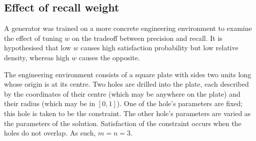 \documentclass[../../main.tex]{subfiles}
\begin{document}
\subsection{Effect of recall weight}

A generator was trained on a more concrete engineering environment to examine the effect of tuning $w$ on the tradeoff between precision and recall.
It is hypothesised that low $w$ causes high satisfaction probability but low relative density, whereas high $w$ causes the opposite.

The engineering environment consists of a square plate with sides two units long whose origin is at its centre.
Two holes are drilled into the plate, each described by the coordinates of their centre (which may be anywhere on the plate) and their radius (which may be in $[0,1]$).
One of the hole's parameters are fixed; this hole is taken to be the constraint.
The other hole's parameters are varied as the parameters of the solution.
Satisfaction of the constraint occurs when the holes do not overlap.
As such, $m=n=3$.
\end{document}
